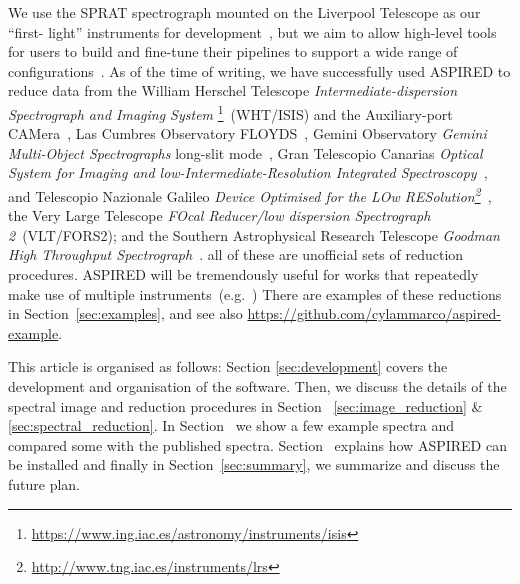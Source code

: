 \documentclass[linenumbers, twocolumn]{aastex631}
\begin{document}
We use the SPRAT spectrograph mounted on the Liverpool Telescope as our ``first-
light'' instruments for
development~\citep{2014SPIE.9147E..8HP}, but we aim to allow high-level tools
for users to build and fine-tune their pipelines to support a wide range of
configurations~\citep{2020arXiv201203505L, marco_2021_4463569}. As of the time
of writing, we have successfully used \textsc{ASPIRED} to reduce data from the
William Herschel Telescope \textit{Intermediate-dispersion Spectrograph and
Imaging System} \footnote{\url{https://www.ing.iac.es/astronomy/instruments/isis}}~(WHT/ISIS)
and the Auxiliary-port CAMera~\citep[ACAM;][]{2008SPIE.7014E..6XB}, Las Cumbres
Observatory FLOYDS~\citep[LCO/FLOYDS;][]{2013PASP..125.1031B}, Gemini Observatory
\textit{Gemini Multi-Object Spectrographs} long-slit
mode~\citep[Gemini/GMOS-LS;][]{2004PASP..116..425H}, Gran Telescopio Canarias
\textit{Optical System for Imaging and low-Intermediate-Resolution Integrated
Spectroscopy}~\citep[GTC/OSIRIS;][]{2000SPIE.4008..623C}, and Telescopio
Nazionale Galileo \textit{Device Optimised for the LOw
RESolution\footnote{\url{http://www.tng.iac.es/instruments/lrs}}}~\citep[TNG/DOLORES;][]{1999ldss.work..157M},
the Very Large Telescope \textit{FOcal Reducer/low dispersion Spectrograph 2}~(VLT/FORS2); and the Southern Astrophysical Research Telescope \textit{Goodman High Throughput Spectrograph}~\citep[SOAR/GHTS][]{2004SPIE.5492..331C}.
all of these are unofficial sets of reduction procedures. \textsc{ASPIRED}
will be tremendously useful for works that repeatedly make use of multiple
instruments~(e.g.\ \citealp{2022A&A...657A..17B})
There are examples of these reductions in Section~\ref{sec:examples}, and see
also \url{https://github.com/cylammarco/aspired-example}.

This article is organised as follows: Section \textsection\ref{sec:development}
covers the development and organisation of the software. Then, we discuss the
details of the spectral image and reduction procedures in Section~\textsection
\ref{sec:image_reduction} \& \ref{sec:spectral_reduction}. In
Section~\textsection{\ref{sec:examples}} we show a few example spectra and
compared some with the published spectra.
Section~\textsection{\ref{sec:distribution}}
explains how \textsc{ASPIRED} can be installed and finally in 
Section~\textsection\ref{sec:summary}, we summarize and discuss the future
plan.
\end{document}
